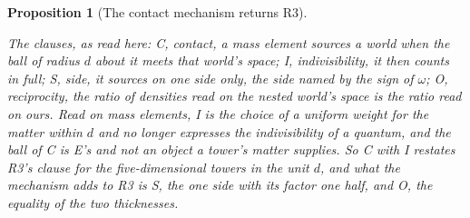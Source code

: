\documentclass[11pt]{article}
\newtheorem{proposition}[theorem]{Proposition}
\theoremstyle{definition}
\theoremstyle{plain}
\begin{document}
\begin{proposition}[The contact mechanism returns R3]
\begin{enumerate}
\end{enumerate}
The clauses, as read here: C, contact, a mass element sources a world when the ball of radius $d$ about it meets that world's space; I, indivisibility, it then counts in full; S, side, it sources on one side only, the side named by the sign of $\omega$; O, reciprocity, the ratio of densities read on the nested world's space is the ratio read on ours. Read on mass elements, I is the choice of a uniform weight for the matter within $d$ and no longer expresses the indivisibility of a quantum, and the ball of C is E's and not an object a tower's matter supplies. So C with I restates R3's clause for the five-dimensional towers in the unit $d$, and what the mechanism adds to R3 is S, the one side with its factor one half, and O, the equality of the two thicknesses.
\end{proposition}
\end{document}
